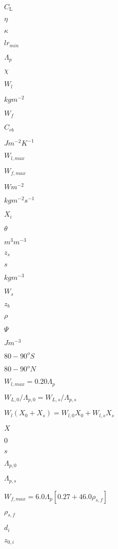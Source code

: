 \documentclass{article}
\begin{document}
$C_\mathrm{L}$
\pagebreak

$\eta$
\pagebreak

$\kappa$
\pagebreak

${lr}_{min}$
\pagebreak

$\Lambda_p$
\pagebreak

$\chi$
\pagebreak

$W_l$
\pagebreak

$kg m^{-2}$
\pagebreak

$W_f$
\pagebreak

$C_{rb}$
\pagebreak

$J m^{-2} K^{-1}$
\pagebreak

$W_{l,max}$
\pagebreak

$W_{f,max}$
\pagebreak

$W m^{-2}$
\pagebreak

$kg m^{-2} s^{-1}$
\pagebreak

$X_i$
\pagebreak

$\theta$
\pagebreak

$m^3 m^{-3}$
\pagebreak

$z_s$
\pagebreak

$ s$
\pagebreak

$kg m^{-3}$
\pagebreak

$W_s$
\pagebreak

$z_b$
\pagebreak

$\rho$
\pagebreak

$\Psi$
\pagebreak

$J m^{-3}$
\pagebreak

$80-90^o S$
\pagebreak

$80-90^o N$
\pagebreak

$W_{l,max} = 0.20 \Lambda_p$
\pagebreak

$W_{L,0} / \Lambda_{p,0} = W_{L,s} / \Lambda_{p,s}$
\pagebreak

$W_l (X_0 + X_s) = W_{l,0} X_0 + W_{l,s} X_s$
\pagebreak

$X$
\pagebreak

$0$
\pagebreak

$s$
\pagebreak

$\Lambda_{p,0}$
\pagebreak

$\Lambda_{p,s}$
\pagebreak

$W_{f,max} = 6.0 \Lambda_p [0.27 + 46.0 \rho_{s,f} ]$
\pagebreak

$\rho_{s,f}$
\pagebreak

$d_i$
\pagebreak

$z_{0,i}$
\pagebreak
\end{document}
